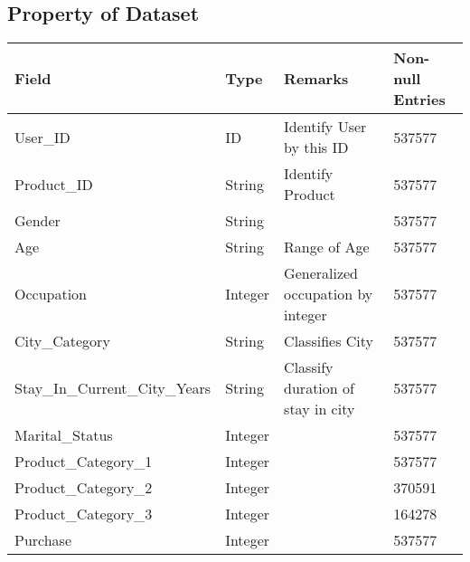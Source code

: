 \documentclass[paper=letter, fontsize=12pt]{article}
\begin{document}
\subsection{Property of Dataset}
\begin{table}[H]
	\centering
	\begin{tabular}{l  l  l  l}
		Field & Type & Remarks & Non-null Entries
		\\ \hline \hline
		User\_ID & ID & Identify User by this ID & 537577
		\\
		Product\_ID & String & Identify Product & 537577
		\\
		Gender & String &  & 537577
		\\
		Age & String & Range of Age & 537577
		\\
		Occupation & Integer & Generalized occupation by integer & 537577
		\\
		City\_Category & String & Classifies City & 537577
		\\
		Stay\_In\_Current\_City\_Years & String & Classify duration of stay in city & 537577
		\\
		Marital\_Status & Integer &  & 537577
		\\
		Product\_Category\_1 & Integer &  & 537577
		\\
		Product\_Category\_2 & Integer &  & 370591
		\\
		Product\_Category\_3 & Integer &  & 164278
		\\
		Purchase & Integer &  & 537577
	\end{tabular}
\end{table}
\end{document}
